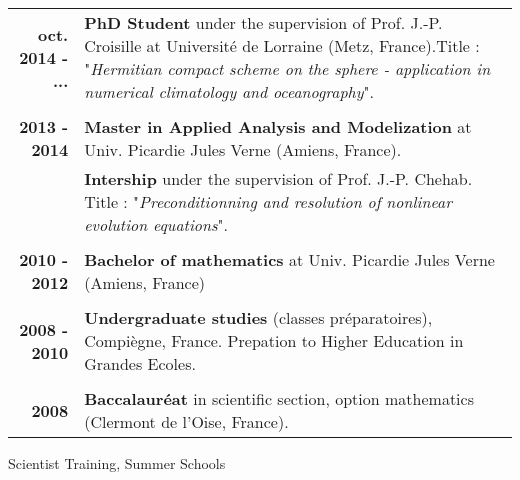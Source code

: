 \documentclass[10pt,a4paper]{report}
\begin{document}
\begin{center}
\begin{tabular}{r p{12cm}}
\textbf{oct. 2014 - ...} & \textbf{PhD Student} under the supervision of Prof. J.-P. Croisille at Université de Lorraine (Metz, France).\newline Title : "\textit{Hermitian compact scheme on the sphere - application in numerical climatology and oceanography}".\\

& \\

\textbf{2013 - 2014} & \textbf{Master in Applied Analysis and Modelization} at Univ. Picardie Jules Verne (Amiens, France). \\

& \textbf{Intership} under the supervision of Prof. J.-P. Chehab. \newline 
Title : "\textit{Preconditionning and resolution of nonlinear evolution equations}". \\

& \\

\textbf{2010 - 2012} & \textbf{Bachelor of mathematics} at Univ. Picardie Jules Verne (Amiens, France) \\

& \\

\textbf{2008 - 2010} & \textbf{Undergraduate studies} (classes préparatoires), Compiègne, France.\newline
Prepation to Higher Education in Grandes Ecoles. \\

& \\

\textbf{2008} & \textbf{Baccalauréat} in scientific section, option mathematics (Clermont de l'Oise, France).\\
\end{tabular}
\end{center}

\vspace{1cm}
\noindent
{\selectfont
\begin{Large}
Scientist Training, Summer Schools
\end{Large}
\hrulefill
}

\vspace{0.6cm}
\end{document}
